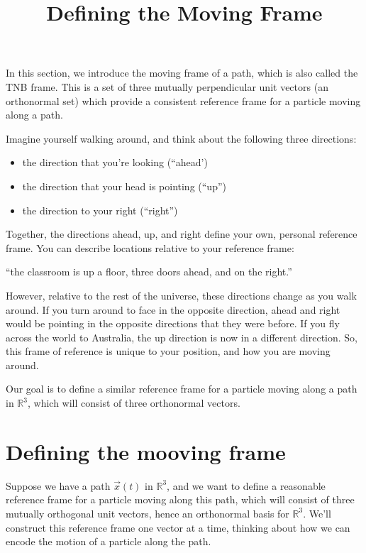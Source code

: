 \documentclass{ximera}
\title{Defining the Moving Frame}
\begin{document}
\begin{abstract}
\end{abstract}
\maketitle

In this section, we introduce the moving frame of a path, which is also called the TNB frame. This is a set of three mutually perpendicular unit vectors (an orthonormal set) which provide a consistent reference frame for a particle moving along a path.

Imagine yourself walking around, and think about the following three directions:
\begin{itemize}
\item the direction that you're looking (``ahead')
\item the direction that your head is pointing (``up'')
\item the direction to your right (``right'')
\end{itemize}
Together, the directions ahead, up, and right define your own, personal reference frame. You can describe locations relative to your reference frame:
\begin{center}
``the classroom is up a floor, three doors ahead, and on the right.'' 
\end{center}
However, relative to the rest of the universe, these directions change as you walk around. If you turn around to face in the opposite direction, ahead and right would be pointing in the opposite directions that they were before. If you fly across the world to Australia, the up direction is now in a different direction. So, this frame of reference is unique to your position, and how you are moving around.

Our goal is to define a similar reference frame for a particle moving along a path in $\mathbb{R}^3$, which will consist of three orthonormal vectors. 

\section*{Defining the mooving frame}

Suppose we have a path $\vec{x}(t)$ in $\mathbb{R}^3$, and we want to define a reasonable reference frame for a particle moving along this path, which will consist of three mutually orthogonal unit vectors, hence an orthonormal basis for $\mathbb{R}^3$. We'll construct this reference frame one vector at a time, thinking about how we can encode the motion of a particle along the path.
\end{document}
